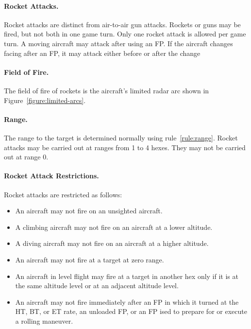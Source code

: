 \begin{advancedrules}
{\paragraph{Rocket Attacks.} Rocket attacks are distinct from air-to-air gun attacks. Rockets or guns may be fired, but not both in one game turn. Only one rocket attack is allowed per game turn. A moving aircraft may attack after using an FP. If the aircraft changes facing after an FP, it may attack either before or after the change

\paragraph{Field of Fire.} The field of fire of rockets is the aircraft's limited radar arc shown in Figure~\ref{figure:limited-arcs}.

\paragraph{Range.} The range to the target is determined normally using rule~\ref{rule:range}. Rocket attacks may be carried out at ranges from 1 to 4 hexes. They may not be carried out at range 0.

\paragraph{Rocket Attack Restrictions.} Rocket attacks are restricted as follows:

\begin{itemize}

    \item An aircraft may not fire on an unsighted aircraft.

    \item A climbing aircraft may not fire on an aircraft at a lower altitude.

    \item A diving aircraft may not fire on an aircraft at a higher altitude.

    \item An aircraft may not fire at a target at zero range.

    \item An aircraft in level flight may fire at a target in another hex only if it is at the same altitude level or at an adjacent altitude level.

    \item An aircraft may not fire immediately after an FP in which it turned at the HT, BT, or ET rate, an unloaded FP, or an FP ised to prepare for or execute a rolling maneuver.


\end{itemize}}
\end{advancedrules}

